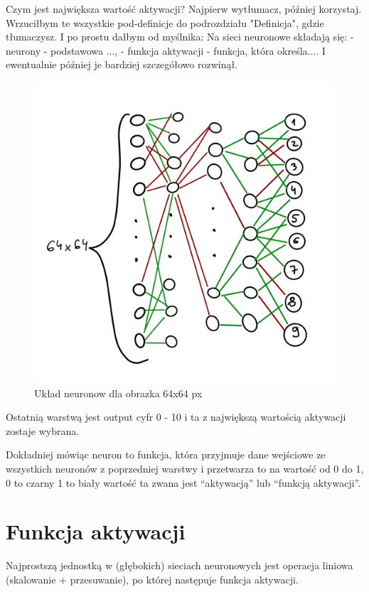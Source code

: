 \documentclass[brudnopis]{xmgr}
\begin{document}
Czym jest największa wartość aktywacji? Najpierw wytłumacz, później korzystaj. Wrzuciłbym te wszystkie pod-definicje do podrozdziału "Definicja", gdzie tłumaczysz. I po prostu dałbym od myślnika: Na sieci neuronowe składają się: - neurony - podstawowa ..., - funkcja aktywacji - funkcja, która określa.... I ewentualnie później je bardziej szczegółowo rozwinął.


\begin{figure}[!tbh]
\centering
\includegraphics[width=.8\hsize]{fig/2}
\caption{Układ neuronow dla obrazka 64x64 px\label{RYS.2}}
\end{figure}



Ostatnią warstwą jest output cyfr 0 - 10 i ta z największą wartością aktywacji zostaje wybrana. 

Dokładniej mówiąc neuron to funkcja, która przyjmuje dane wejściowe ze wszystkich neuronów z poprzedniej warstwy i przetwarza to na wartość od 0 do 1, 0 to czarny 1 to biały wartość ta zwana jest “aktywacją” lub “funkcją aktywacji”.

\section{Funkcja aktywacji  \label{s:dsssl}}

Najprostszą jednostką w (głębokich) sieciach neuronowych jest operacja liniowa (skalowanie + przesuwanie), po której następuje funkcja aktywacji.
\end{document}
